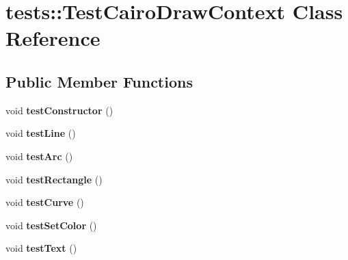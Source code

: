 \hypertarget{classtests_1_1_test_cairo_draw_context}{
\section{tests::TestCairoDrawContext Class Reference}
\label{classtests_1_1_test_cairo_draw_context}
}
\subsection*{Public Member Functions}
\begin{DoxyCompactItemize}
\item 
\hypertarget{classtests_1_1_test_cairo_draw_context_ad4714d5f1fd8d91721904b83751cbb84}{
void {\bfseries testConstructor} ()}
\label{classtests_1_1_test_cairo_draw_context_ad4714d5f1fd8d91721904b83751cbb84}

\item 
\hypertarget{classtests_1_1_test_cairo_draw_context_adf0fec2463838de9077ae71edc42ce9a}{
void {\bfseries testLine} ()}
\label{classtests_1_1_test_cairo_draw_context_adf0fec2463838de9077ae71edc42ce9a}

\item 
\hypertarget{classtests_1_1_test_cairo_draw_context_acdc6e84ffa0fb91070a519f0ff742bea}{
void {\bfseries testArc} ()}
\label{classtests_1_1_test_cairo_draw_context_acdc6e84ffa0fb91070a519f0ff742bea}

\item 
\hypertarget{classtests_1_1_test_cairo_draw_context_aca4b63375d6c80d66cc0c6c463893be3}{
void {\bfseries testRectangle} ()}
\label{classtests_1_1_test_cairo_draw_context_aca4b63375d6c80d66cc0c6c463893be3}

\item 
\hypertarget{classtests_1_1_test_cairo_draw_context_a8a00569243a721f493d0380ddabe892c}{
void {\bfseries testCurve} ()}
\label{classtests_1_1_test_cairo_draw_context_a8a00569243a721f493d0380ddabe892c}

\item 
\hypertarget{classtests_1_1_test_cairo_draw_context_a38c244e9fade470c7bb1deeb54988e26}{
void {\bfseries testSetColor} ()}
\label{classtests_1_1_test_cairo_draw_context_a38c244e9fade470c7bb1deeb54988e26}

\item 
\hypertarget{classtests_1_1_test_cairo_draw_context_a41c88b804e8b00e27b3ce8f3391afcdf}{
void {\bfseries testText} ()}
\label{classtests_1_1_test_cairo_draw_context_a41c88b804e8b00e27b3ce8f3391afcdf}


\end{DoxyCompactItemize}
